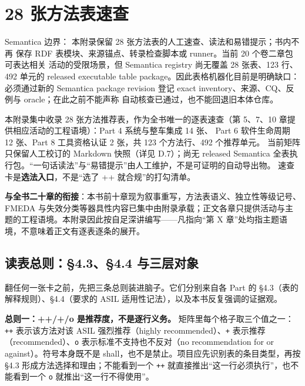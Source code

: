 \chapter{28 张方法表速查}

\begin{noteblock}
Semantica 边界： 本附录保留 28 张方法表的人工速查、读法和易错提示；书内不再
保存 RDF 表模块、来源锚点、转录检查脚本或 runner。当前 20 个卷二章包可表达相关
活动的受限场景，但 Semantica registry 尚无覆盖 28 张表、123 行、492 单元的 released
executable table package。因此表格机器化目前是明确缺口：必须通过新的 Semantica
package revision 登记 exact inventory、来源、CQ、反例与 oracle；在此之前不能声称
自动核查已通过，也不能回退旧本体仓库。
\end{noteblock}

\begin{noteblock}
本附录集中收录 28 张方法推荐表，作为全书唯一的逐表速查（第 5、7、10 章提供相应活动的工程语境）：Part 4 系统与整车集成 14 张、
Part 6 软件生命周期 12 张、Part 8 工具资格认证 2 张，共 123 个方法行、492 个推荐单元。
当前矩阵只保留人工校订的 Markdown 快照（详见 D.7）；尚无 released Semantica
全表执行包。“一句话读法”与“易错提示”由人工维护，不是可证明的自动导出物。
速查卡是\textbf{选法入口}，不是“选了 ++ 就合规”的打勾清单。

\textbf{与全书二十章的衔接}：本书前十章现为叙事重写，方法表语义、独立性等级记号、FMEDA 与失效分类等器具性内容已集中由附录承载；正文各章只提供活动与主题的工程语境。本附录因此按自足深讲编写——凡指向“第 X 章”处均指主题语境，不意味着正文有逐表逐条的展开。
\end{noteblock}

\section{读表总则：§4.3、§4.4 与三层对象}

翻任何一张卡之前，先把三条总则装进脑子。它们分别来自各 Part 的 §4.3（表的解释规则）、§4.4（要求的 ASIL 适用性记法），以及本书反复强调的证据观。

\textbf{总则一：++/+/o 是推荐度，不是逐行义务。} 矩阵里每个格子取三个值之一：\nolinkurl{++} 表示该方法对该 ASIL 强烈推荐（highly recommended）、\nolinkurl{+} 表示推荐（recommended）、\nolinkurl{o} 表示标准不支持也不反对（no recommendation for or against）。符号本身既不是 shall，也不是禁止。项目应先识别表的条目类型，再按 §4.3 形成方法选择和理由；不能看到一个 \nolinkurl{++} 就直接推出“这一行必须执行”，也不能看到一个 \nolinkurl{o} 就推出“这一行不得使用”。

